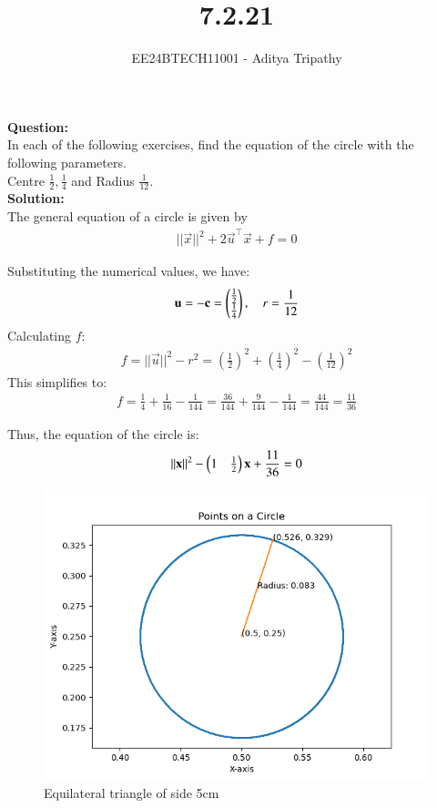 \documentclass[journal]{IEEEtran}
\begin{document}

\vspace{3cm}

\title{7.2.21}
\author{EE24BTECH11001 - Aditya Tripathy
}
{\let\newpage\relax\maketitle}

\renewcommand{\thefigure}{\theenumi}
\renewcommand{\thetable}{\theenumi}
\setlength{\intextsep}{10pt} %

\textbf{Question:}\\
In each of the following exercises,  find the equation of the circle with the following parameters.\\
Centre $\frac{1}{2},  \frac{1}{4}$ and Radius $\frac{1}{12}$.
\\
\textbf{Solution:}\\
The general equation of a circle is given by 
\begin{align}
    ||\vec{x}||^2 + 2 \vec{u}^{\top}\vec{x} + f = 0
\end{align}

Substituting the numerical values, we have:
\begin{align}
    \mathbf{u} = -\mathbf{c} = \begin{pmatrix}\frac{1}{2} \\ \frac{1}{4}\end{pmatrix}, \quad r = \frac{1}{12}
\end{align}
Calculating \(f\):
\begin{align}
    f = ||\vec{u}||^2 - r^2 = \left(\frac{1}{2}\right)^2 + \left(\frac{1}{4}\right)^2 - \left(\frac{1}{12}\right)^2 
\end{align}
This simplifies to:
\begin{align}
    f = \frac{1}{4} + \frac{1}{16} - \frac{1}{144} = \frac{36}{144} + \frac{9}{144} - \frac{1}{144} = \frac{44}{144} = \frac{11}{36}
\end{align}

Thus, the equation of the circle is:
\begin{align}
    ||\mathbf{x}||^2 - \begin{pmatrix}1 & \frac{1}{2}\end{pmatrix} \mathbf{x} + \frac{11}{36} = 0
\end{align}

\begin{figure}[h!]
   \centering
   \includegraphics[width=0.7\linewidth]{figs/fig.png}
   \caption{Equilateral triangle of side 5cm}
\end{figure}
\end{document}
